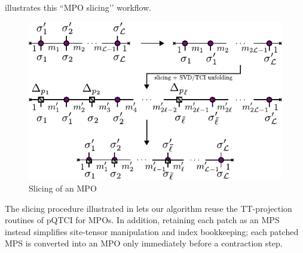  illustrates this “MPO slicing’’ workflow.

\begin{figure}[ht!]
    \centering
    \includegraphics{figures/SlicingMPO.pdf}
    \caption{Slicing of an MPO}
    \label{fig:MPOSlicing}
\end{figure}
The slicing procedure illustrated in  lets our algorithm reuse the TT-projection routines of pQTCI for MPOs. In addition, retaining each patch as an MPS instead simplifies site-tensor manipulation and index bookkeeping; each patched MPS is converted into an MPO only immediately before a contraction step.

